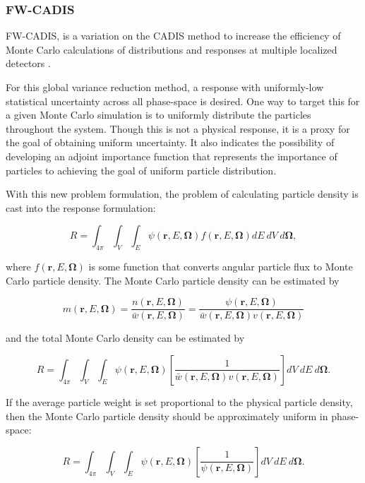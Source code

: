 \documentclass{article} %
\newcommand{\bo}{\mathbf\Omega}
\newcommand{\vecr}{\textbf{r}}
\newcommand{\fwc}{\mbox{FW-CADIS}}
\begin{document}
\subsubsection{\fwc}

\fwc, is a variation on the CADIS method to increase the efficiency of Monte
Carlo calculations of distributions and responses at multiple localized
detectors \cite{fwcadis}.

For this global variance reduction method, a response with uniformly-low
statistical uncertainty across all phase-space is desired. One way to target
this for a given Monte Carlo simulation is to uniformly distribute the
particles throughout the system. Though this is not a physical response, it is
a proxy for the goal of obtaining uniform uncertainty. It also indicates the
possibility of developing an adjoint importance function that represents the
importance of particles to achieving the goal of uniform particle distribution.

With this new problem formulation, the problem of calculating particle density
is cast into the response formulation:

\begin{equation}
R = \int_{4\pi}\int_{V}\int_{E}\psi(\vecr,E,\bo)f(\vecr,E,\bo)dE\ dV\ d\bo,
\end{equation}

\noindent where $f(\vecr,E,\bo)$ is some function that converts angular
particle flux to Monte Carlo particle density. The Monte Carlo particle 
density can be estimated by

\begin{equation}
m(\vecr,E,\bo) = \frac{n(\vecr,E,\bo)}{\bar{w}(\vecr,E,\bo)} 
= \frac{\psi(\vecr,E,\bo)}{\bar{w}(\vecr,E,\bo)v(\vecr,E,\bo)}
\end{equation}

\noindent and the total Monte Carlo density can be estimated by

\begin{equation}
R = \int_{4\pi}\int_{V}\int_{E}\psi(\vecr,E,\bo)
\left[\frac{1}{\bar{w}(\vecr,E,\bo)v(\vecr,E,\bo)}\right]dV\ dE\ d\bo.
\label{eq:fwcadis_r}
\end{equation}

If the average particle weight is set proportional to the physical particle
density, then the Monte Carlo particle density should be approximately uniform
in phase-space:

\begin{equation}
R = \int_{4\pi}\int_{V}\int_{E}\psi(\vecr,E,\bo)
\left[\frac{1}{\psi(\vecr,E,\bo)}\right]dV\ dE\ d\bo.
\end{equation}
\end{document}
